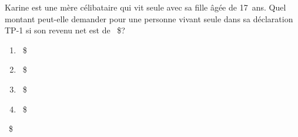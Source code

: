 \begin{question}
	Karine est une mère célibataire qui vit seule avec sa fille âgée de 17~ans. Quel montant peut-elle demander pour une personne vivant seule dans sa déclaration TP-1 si son revenu net est de ~\$?
	\begin{enumerate}[label=\Alph*.]
		\item {}~\$
		\item {}~\$
		\item {}~\$
		\item {}~\$
	\end{enumerate}
\end{question}
~\$
